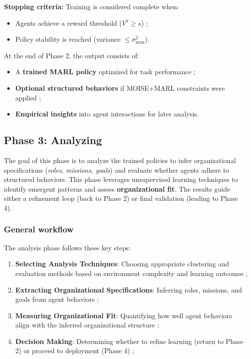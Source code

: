 \documentclass[pdflatex,sn-mathphys-num]{sn-jnl}%
\theoremstyle{thmstyleone}%
\theoremstyle{thmstyletwo}%
\theoremstyle{thmstylethree}%
\begin{document}
\noindent \textbf{Stopping criteria:}
Training is considered complete when:
\begin{itemize}
    \item Agents achieve a reward threshold ($V^{\pi} \geq s$) ;
    \item Policy stability is reached (variance $\leq \sigma_{\max}^2$).
\end{itemize}

At the end of Phase 2, the output consists of:
\begin{itemize}
    \item A \textbf{trained MARL policy} optimized for task performance ;
    \item \textbf{Optional structured behaviors} if MOISE+MARL constraints were applied ;
    \item \textbf{Empirical insights} into agent interactions for later analysis.
\end{itemize}


\subsection{Phase 3: Analyzing}

The goal of this phase is to analyze the trained policies to infer organizational specifications (\textit{roles, missions, goals}) and evaluate whether agents adhere to structured behaviors. This phase leverages unsupervised learning techniques to identify emergent patterns and assess \textbf{organizational fit}. The results guide either a refinement loop (back to Phase 2) or final validation (leading to Phase 4).

\subsubsection{General workflow}
The analysis phase follows these key steps:
\begin{enumerate}
    \item \textbf{Selecting Analysis Techniques}: Choosing appropriate clustering and evaluation methods based on environment complexity and learning outcomes ;
    \item \textbf{Extracting Organizational Specifications}: Inferring roles, missions, and goals from agent behaviors ;
    \item \textbf{Measuring Organizational Fit}: Quantifying how well agent behaviors align with the inferred organizational structure ;
    \item \textbf{Decision Making}: Determining whether to refine learning (return to Phase 2) or proceed to deployment (Phase 4) ;
\end{enumerate}
\end{document}
